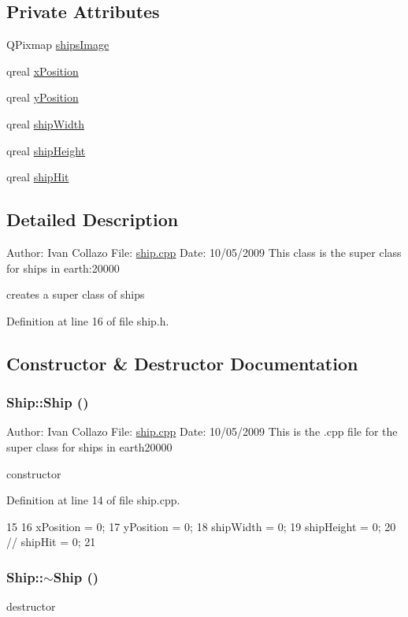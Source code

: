 \subsection*{Private Attributes}
\begin{DoxyCompactItemize}
\item 
QPixmap \hyperlink{class_ship_a3e61137191ddd959a57e0cd8928b4873}{shipsImage}
\item 
qreal \hyperlink{class_ship_a6ccec9a60696c66ede61af7397c73b3c}{xPosition}
\item 
qreal \hyperlink{class_ship_a5964ed05737d3b6722c7af5e0f173475}{yPosition}
\item 
qreal \hyperlink{class_ship_ae57e882cf6611414d239b241f6711ba6}{shipWidth}
\item 
qreal \hyperlink{class_ship_a16205aae21b89c3fb57960a70be931a2}{shipHeight}
\item 
qreal \hyperlink{class_ship_a1fd726a67e6b11d5ce19f4657db40237}{shipHit}
\end{DoxyCompactItemize}


\subsection{Detailed Description}
Author: Ivan Collazo File: \hyperlink{ship_8cpp}{ship.cpp} Date: 10/05/2009 This class is the super class for ships in earth:20000

creates a super class of ships 

Definition at line 16 of file ship.h.

\subsection{Constructor \& Destructor Documentation}
\hypertarget{class_ship_ab7608fcfc4d27c678aacaf9bfd68a462}{
\subsubsection[{Ship}]{\setlength{\rightskip}{0pt plus 5cm}Ship::Ship ()}}
\label{class_ship_ab7608fcfc4d27c678aacaf9bfd68a462}
Author: Ivan Collazo File: \hyperlink{ship_8cpp}{ship.cpp} Date: 10/05/2009 This is the .cpp file for the super class for ships in earth20000

constructor 

Definition at line 14 of file ship.cpp.


\begin{DoxyCode}
15 {
16     xPosition = 0;
17     yPosition = 0;
18     shipWidth = 0;
19     shipHeight = 0;
20    // shipHit = 0;
21 }
\end{DoxyCode}
\hypertarget{class_ship_a43cd6eeaffc11b49239b091621963a65}{
\subsubsection[{$\sim$Ship}]{\setlength{\rightskip}{0pt plus 5cm}Ship::$\sim$Ship ()}}
\label{class_ship_a43cd6eeaffc11b49239b091621963a65}
destructor 


